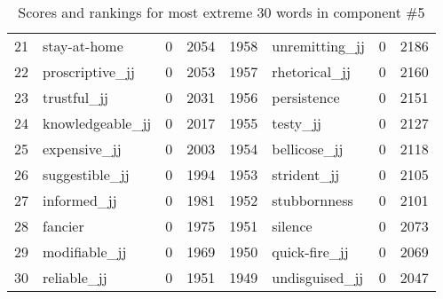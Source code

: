 \begin{table}[tbp]
\begin{tabular}{| rlr@{.}l | rlr@{.}l |}
    21 & stay-at-home & 0 & 2054    &    1958 & unremitting\_jj & 0 & 2186 \\
    22 & proscriptive\_jj & 0 & 2053    &    1957 & rhetorical\_jj & 0 & 2160 \\
    23 & trustful\_jj & 0 & 2031    &    1956 & persistence & 0 & 2151 \\
    24 & knowledgeable\_jj & 0 & 2017    &    1955 & testy\_jj & 0 & 2127 \\
    25 & expensive\_jj & 0 & 2003    &    1954 & bellicose\_jj & 0 & 2118 \\
    26 & suggestible\_jj & 0 & 1994    &    1953 & strident\_jj & 0 & 2105 \\
    27 & informed\_jj & 0 & 1981    &    1952 & stubbornness & 0 & 2101 \\
    28 & fancier & 0 & 1975    &    1951 & silence & 0 & 2073 \\
    29 & modifiable\_jj & 0 & 1969    &    1950 & quick-fire\_jj & 0 & 2069 \\
    30 & reliable\_jj & 0 & 1951    &    1949 & undisguised\_jj & 0 & 2047 \\
    \hline
    \end{tabular}
    \caption{Scores and rankings for most extreme 30 words in component \#5} 
\end{table}
\clearpage
